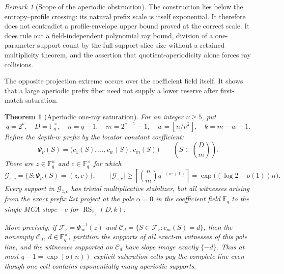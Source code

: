 \documentclass[11pt,a4paper]{amsart}
\numberwithin{equation}{section}
\newtheorem{theorem}{Theorem}[section]
\theoremstyle{remark}
\newtheorem{remark}[remark]{Remark}
\DeclareMathOperator{\RS}{RS}
\newcommand{\F}{\mathbb F}
\newcommand{\Ccal}{\mathcal C}
\newcommand{\Fcal}{\mathcal F}
\newcommand{\Gcal}{\mathcal G}
\newcommand{\abs}[1]{\lvert #1\rvert}
\newcommand{\floor}[1]{\left\lfloor #1\right\rfloor}
\newcommand{\ceil}[1]{\left\lceil #1\right\rceil}
\begin{document}
\begin{remark}[Scope of the aperiodic obstruction]
The construction lies below the entropy--profile crossing: its natural
prefix scale is itself exponential.  It therefore does not contradict a
profile-envelope upper bound proved at the correct scale.  It does rule
out a field-independent polynomial ray bound, division of a one-parameter
support count by the full support-slice size without a retained multiplicity
theorem, and the assertion
that quotient-aperiodicity alone forces ray collisions.
\end{remark}

The opposite projection extreme occurs over the coefficient field itself.
It shows that a large aperiodic prefix fiber need not supply a lower
reserve after first-match saturation.

\begin{theorem}[Aperiodic one-ray saturation]
\label{thm:aperiodic-one-ray-saturation}
For an integer \(\nu\ge5\), put
\[
 q=2^\nu,\quad D=\F_q^\times,\quad n=q-1,\quad
 m=2^{\nu-1}-1,\quad w=\floor{n/\nu^2},\quad k=m-w-1.
\]
Refine the depth-\(w\) prefix by the locator constant coefficient:
\[
 \Psi_\nu(S)=\bigl(c_1(S),\ldots,c_w(S),c_m(S)\bigr)
 \qquad\left(S\in\binom Dm\right).
\]
There are \(z\in\F_q^w\) and \(c\in\F_q^\times\) for which
\[
 \Gcal_{z,c}=\{S:\Psi_\nu(S)=(z,c)\},
 \qquad
 \abs{\Gcal_{z,c}}
 \ge\ceil{\binom nm q^{-(w+1)}}
 =\exp\bigl((\log2-o(1))n\bigr).                  \tag{SAT1}
\label{eq:one-ray-large-fiber}
\]
Every support in \(\Gcal_{z,c}\) has trivial multiplicative stabilizer,
but all witnesses arising from the exact prefix list project at the pole
\(\alpha=0\) in the coefficient field \(\F_q\) to the single MCA slope \(-c\) for
\(\RS_{\F_q}(D,k)\).

More precisely, if \(\Fcal_z=\Phi_w^{-1}(z)\) and
\(\Ccal_d=\{S\in\Fcal_z:c_m(S)=d\}\), then the nonempty
\(\Ccal_d\), \(d\in\F_q^\times\), partition the supports of all
exact-\(m\) witnesses of this pole line, and the witnesses supported on
\(\Ccal_d\) have slope image exactly \(\{-d\}\).  Thus at most
\(q-1=\exp(o(n))\) explicit saturation cells
pay the complete line even though one cell contains exponentially many
aperiodic supports.
\end{theorem}
\end{document}
